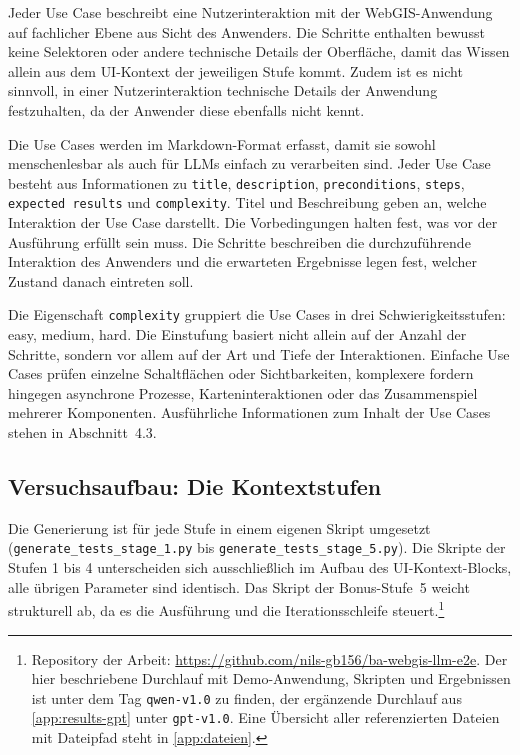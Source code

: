 Jeder Use Case beschreibt eine Nutzerinteraktion mit der WebGIS-Anwendung auf fachlicher Ebene aus Sicht des Anwenders. Die Schritte enthalten bewusst keine Selektoren oder andere technische Details der Oberfläche, damit das Wissen allein aus dem \ac{UI}-Kontext der jeweiligen Stufe kommt. Zudem ist es nicht sinnvoll, in einer Nutzerinteraktion technische Details der Anwendung festzuhalten, da der Anwender diese ebenfalls nicht kennt.

Die Use Cases werden im Markdown-Format erfasst, damit sie sowohl menschenlesbar als auch für \acp{LLM} einfach zu verarbeiten sind. Jeder Use Case besteht aus Informationen zu \texttt{title}, \texttt{description}, \texttt{preconditions}, \texttt{steps}, \texttt{expected results} und \texttt{complexity}. Titel und Beschreibung geben an, welche Interaktion der Use Case darstellt. Die Vorbedingungen halten fest, was vor der Ausführung erfüllt sein muss. Die Schritte beschreiben die durchzuführende Interaktion des Anwenders und die erwarteten Ergebnisse legen fest, welcher Zustand danach eintreten soll.

Die Eigenschaft \texttt{complexity} gruppiert die Use Cases in drei Schwierigkeitsstufen: easy, medium, hard. Die Einstufung basiert nicht allein auf der Anzahl der Schritte, sondern vor allem auf der Art und Tiefe der Interaktionen. Einfache Use Cases prüfen einzelne Schaltflächen oder Sichtbarkeiten, komplexere fordern hingegen asynchrone Prozesse, Karteninteraktionen oder das Zusammenspiel mehrerer Komponenten. Ausführliche Informationen zum Inhalt der Use Cases stehen in Abschnitt~4.3.

\subsection{Versuchsaufbau: Die Kontextstufen}

Die Generierung ist für jede Stufe in einem eigenen Skript umgesetzt (\texttt{generate\_tests\_stage\_1.py} bis \texttt{generate\_tests\_stage\_5.py}). Die Skripte der Stufen 1 bis 4 unterscheiden sich ausschließlich im Aufbau des \ac{UI}-Kontext-Blocks, alle übrigen Parameter sind identisch. Das Skript der Bonus-Stufe~5 weicht strukturell ab, da es die Ausführung und die Iterationsschleife steuert.\footnote{\label{fn:repo}Repository der Arbeit: \url{https://github.com/nils-gb156/ba-webgis-llm-e2e}. Der hier beschriebene Durchlauf mit Demo-Anwendung, Skripten und Ergebnissen ist unter dem Tag \texttt{qwen-v1.0} zu finden, der ergänzende Durchlauf aus \ref{app:results-gpt} unter \texttt{gpt-v1.0}. Eine Übersicht aller referenzierten Dateien mit Dateipfad steht in \ref{app:dateien}.}

